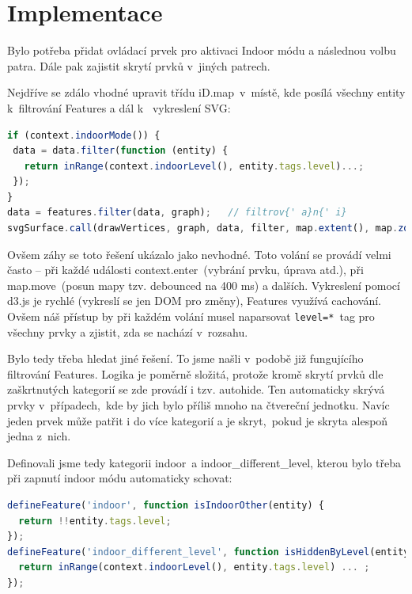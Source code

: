 \section{Implementace}\label{implementace}

Bylo potřeba přidat ovládací prvek pro aktivaci Indoor módu a následnou volbu patra. Dále pak zajistit skrytí prvků v~jiných patrech.

Nejdříve se zdálo vhodné upravit třídu iD.map~v~místě, kde posílá všechny entity k~filtrování Features a dál k ~vykreslení SVG:

\begin{lstlisting}[language=javascript]
if (context.indoorMode()) {
 data = data.filter(function (entity) {
   return inRange(context.indoorLevel(), entity.tags.level)...;
 });
}
data = features.filter(data, graph);   // filtrov{' a}n{' i}
svgSurface.call(drawVertices, graph, data, filter, map.extent(), map.zoom()) ...
\end{lstlisting}



Ovšem záhy se toto řešení ukázalo jako nevhodné. Toto volání se provádí velmi často -- při každé události context.enter~(vybrání prvku, úprava atd.), při map.move~(posun mapy tzv. debounced na 400 ms) a dalších. Vykreslení pomocí d3.js je rychlé (vykreslí se jen DOM pro změny), Features využívá cachování. Ovšem náš přístup by při každém volání musel naparsovat \texttt{level=*}~tag pro všechny prvky a zjistit, zda se nachází v~rozsahu.

Bylo tedy třeba hledat jiné řešení. To jsme našli v~podobě již fungujícího filtrování Features. Logika je poměrně složitá, protože kromě skrytí prvků dle zaškrtnutých kategorií se zde provádí i tzv. autohide. Ten automaticky skrývá prvky v~případech,~kde by jich bylo příliš mnoho na čtvereční jednotku. Navíc jeden prvek může patřit i do více kategorií a je skryt,~pokud je skryta alespoň jedna z~nich.

Definovali jsme tedy kategorii indoor~a indoor\_different\_level, kterou bylo třeba při zapnutí indoor módu automaticky schovat:

\begin{lstlisting}[language=javascript]
defineFeature('indoor', function isIndoorOther(entity) {
  return !!entity.tags.level;
});
defineFeature('indoor_different_level', function isHiddenByLevel(entity, resolver, geometry) {
  return inRange(context.indoorLevel(), entity.tags.level) ... ;
});
\end{lstlisting}


